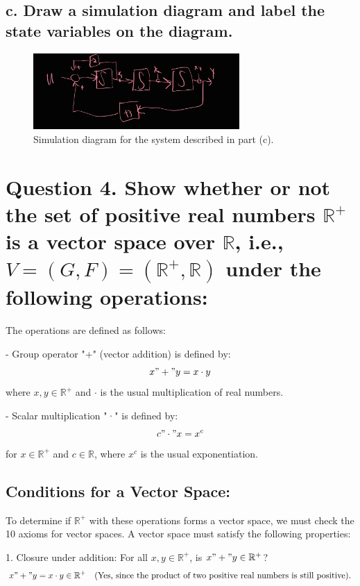\documentclass{article}
\begin{document}
\subsection*{c. Draw a simulation diagram and label the state variables on the diagram.}

\begin{figure}[h!]
    \centering
    \includegraphics[width=0.7\textwidth]{midterm3c.jpg}
    \caption{Simulation diagram for the system described in part (c).}
    \label{fig:midterm3c}
\end{figure}

\section*{Question 4. Show whether or not the set of positive real numbers \( \mathbb{R}^+ \) is a vector space over \( \mathbb{R} \), i.e., \( V = (G,F) = (\mathbb{R}^+, \mathbb{R}) \) under the following operations:}

The operations are defined as follows:

- Group operator "+" (vector addition) is defined by:
\[
x " + " y = x \cdot y
\]
where \( x, y \in \mathbb{R}^+ \) and \( \cdot \) is the usual multiplication of real numbers.

- Scalar multiplication "·" is defined by:
\[
c " \cdot " x = x^c
\]
for \( x \in \mathbb{R}^+ \) and \( c \in \mathbb{R} \), where \( x^c \) is the usual exponentiation.

\subsection*{Conditions for a Vector Space:}

To determine if \( \mathbb{R}^+ \) with these operations forms a vector space, we must check the 10 axioms for vector spaces. A vector space must satisfy the following properties:

1. Closure under addition: For all \( x, y \in \mathbb{R}^+ \), is \( x " + " y \in \mathbb{R}^+ \)?
   \[
   x " + " y = x \cdot y \in \mathbb{R}^+ \quad \text{(Yes, since the product of two positive real numbers is still positive).}
   \]
\end{document}
